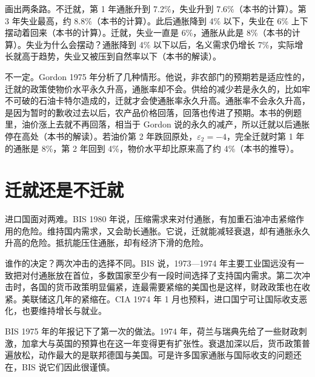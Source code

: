 画出两条路。不迁就，第 1 年通胀升到 7.2\%，失业升到 7.6\%（本书的计算）。第 3 年失业最高，约 8.8\%（本书的计算）。此后通胀降到 4\% 以下，失业在 6\% 上下摆动着回来（本书的计算）。迁就，失业一直是 6\%，通胀从此是 8\%（本书的计算）。失业为什么会摆动？通胀降到 4\% 以下以后，名义需求仍增长 7\%，实际增长就高于趋势，失业又被压到自然率以下（本书的解读）。

\begin{pitfall}[油价上涨一定带来持久的通胀]
不一定。Gordon 1975 年分析了几种情形\cite{gordon1975}。他说，非农部门的预期若是适应性的，迁就的政策使物价水平永久升高，通胀率却不会\cite{gordon1975}。供给的减少若是永久的，比如牢不可破的石油卡特尔造成的，迁就才会使通胀率永久升高\cite{gordon1975}。通胀率不会永久升高，是因为暂时的歉收过去以后，农产品价格回落，回落也传进了预期\cite{gordon1975}。本书的例题里，油价涨上去就不再回落，相当于 Gordon 说的永久的减产，所以迁就以后通胀停在高处（本书的解读）。若油价第 2 年跌回原处，$\varepsilon_2=-4$，完全迁就时第 1 年的通胀是 8\%，第 2 年回到 4\%，物价水平却比原来高了约 4\%（本书的推导）。
\end{pitfall}

\section{迁就还是不迁就}\label{sec:oil-policy}

进口国面对两难。BIS 1980 年说，压缩需求来对付通胀，有加重石油冲击紧缩作用的危险。维持国内需求，又会助长通胀\cite{bis1980}。它说，迁就能减轻衰退，却有通胀永久升高的危险\cite{bis1980}。抵抗能压住通胀，却有经济下滑的危险\cite{bis1980}。

谁作的决定？两次冲击的选择不同。BIS 说，1973—1974 年主要工业国远没有一致把对付通胀放在首位，多数国家至少有一段时间选择了支持国内需求\cite{bis1980}。第二次冲击时，各国的货币政策明显偏紧，连最需要紧缩的美国也是这样，财政政策也在收紧\cite{bis1980}。美联储这几年的紧缩在。CIA 1974 年 1 月也预料，进口国宁可让国际收支恶化，也要维持增长与就业\cite{frus47}。

BIS 1975 年的年报记下了第一次的做法。1974 年，荷兰与瑞典先给了一些财政刺激，加拿大与英国的预算也在这一年变得更有扩张性\cite{bis1975}。衰退加深以后，货币政策普遍放松，动作最大的是联邦德国与美国\cite{bis1975}。可是许多国家通胀与国际收支的问题还在，BIS 说它们因此很谨慎\cite{bis1975}。

